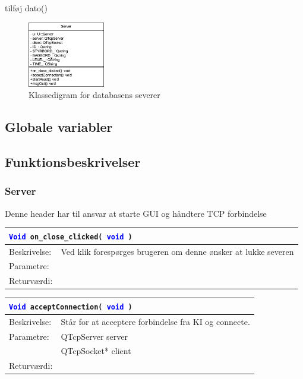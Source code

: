 tilføj dato()
\begin{figure}[htbp]
	\centering
	\includegraphics[width=0.3\textwidth]{billeder/serverKlassediagram}
	\caption{Klassedigram for databasens severer}
	\label{fig:serverKlassediagram}
\end{figure}

\subsection{Globale variabler}


\subsection{Funktionsbeskrivelser}
\subsubsection{Server}
Denne header har til ansvar at starte GUI og håndtere TCP forbindelse\\

\begin{table}[H]
\begin{tabular}{l p{12.5cm}}
\multicolumn{2}{l}{\texttt{\textcolor{blue}{Void} on\_close\_clicked( \textcolor{blue}{void} )}} \\
\hline
Beskrivelse:&Ved klik forespørges brugeren om denne ønsker at lukke severen\\
Parametre:&\\
Returværdi:&\\
\end{tabular}
\end{table}

\begin{table}[H]
\begin{tabular}{l p{12.5cm}}
\multicolumn{2}{l}{\texttt{\textcolor{blue}{Void} acceptConnection( \textcolor{blue}{void} )}} \\
\hline
Beskrivelse:&Står for at acceptere forbindelse fra KI og connecte.\\
Parametre:&QTcpServer server\\
				&QTcpSocket* client\\
Returværdi:&\\
\end{tabular}
\end{table}

